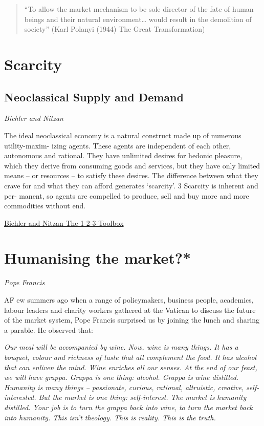 \documentclass[
]{book}
\begin{document}
\begin{quote}
``To allow the market mechanism to be sole director of the fate of human
beings and their natural environment\ldots{} would result in the demolition of
society'' (Karl Polanyi (1944) The Great Transformation)
\end{quote}

\hypertarget{scarcity}{%
\section{Scarcity}\label{scarcity}}

\hypertarget{neoclassical-supply-and-demand}{%
\subsection{Neoclassical Supply and Demand}\label{neoclassical-supply-and-demand}}

\emph{Bichler and Nitzan}

The ideal neoclassical economy is a natural construct made up of numerous utility-maxim-
izing agents. These agents are independent of each other, autonomous and rational. They have
unlimited desires for hedonic pleasure, which they derive from consuming goods and services,
but they have only limited means -- or resources -- to satisfy these desires. The difference between
what they crave for and what they can afford generates `scarcity'. 3 Scarcity is inherent and per-
manent, so agents are compelled to produce, sell and buy more and more commodities without
end.

\href{Bichler_Nitzan_The_1_2_3_Toolbox.pdf}{Bichler and Nitzan The 1-2-3-Toolbox}

\hypertarget{humanising-the-market}{%
\section{Humanising the market?*}\label{humanising-the-market}}

\emph{Pope Francis}

AF ew summers ago when a range of policymakers, business people, academics, labour leaders and charity workers gathered at the Vatican to discuss the future of the market system, Pope Francis surprised us by joining the lunch and sharing a parable. He observed that:

\emph{Our meal will be accompanied by wine. Now, wine is many things. It has a bouquet, colour and richness of taste that all complement the food. It has alcohol that can enliven the mind. Wine enriches all our senses.
At the end of our feast, we will have grappa. Grappa is one thing: alcohol. Grappa is wine distilled.
Humanity is many things -- passionate, curious, rational, altruistic, creative, self-interested. But the market is one thing: self-interest. The market is humanity distilled.
Your job is to turn the grappa back into wine, to turn the market back into humanity. This isn't theology. This is reality. This is the truth.}
\end{document}
